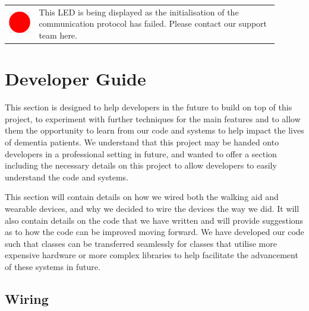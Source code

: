\begin{tabular}{ m{0.1\linewidth} m{0.8\linewidth} }
				\vspace{2em}
				\includegraphics[width=0.5\linewidth]{graphics/red_circle.png}
				
				& This LED is being displayed as the initialisation of the communication protocol has failed. Please contact our support team here. \\
				 
			\end{tabular}

	\newpage
	\section{Developer Guide}
	\label{sec:developer_guide}

		This section is designed to help developers in the future to build on top of this project, to experiment with further techniques for the main features and to allow them the opportunity to learn from our code and systems to help impact the lives of dementia patients. We understand that this project may be handed onto developers in a professional setting in future, and wanted to offer a section including the necessary details on this project to allow developers to easily understand the code and systems.

		This section will contain details on how we wired both the walking aid and wearable devices, and why we decided to wire the devices the way we did. It will also contain details on the code that we have written and will provide suggestions as to how the code can be improved moving forward. We have developed our code such that classes can be transferred seamlessly for classes that utilise more expensive hardware or more complex libraries to help facilitate the advancement of these systems in future. 

		\subsection{Wiring}
		\label{subsec:wiring}

